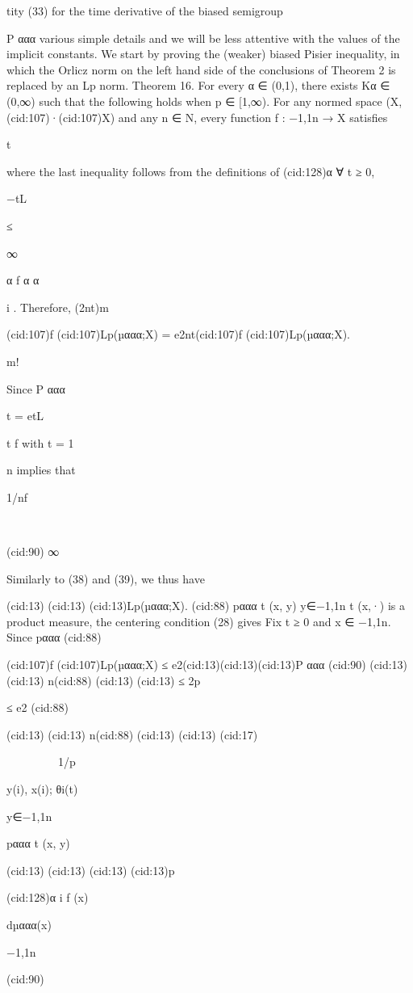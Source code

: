 tity (33) for the time derivative of the biased semigroup {P ααα
various simple details and we will be less attentive with the values of the implicit constants.
We start by proving the (weaker) biased Pisier inequality, in which the Orlicz norm on the
left hand side of the conclusions of Theorem 2 is replaced by an Lp norm.
Theorem 16. For every α ∈ (0,1), there exists Kα ∈ (0,∞) such that the following holds when
p ∈ [1,∞). For any normed space (X,(cid:107)·(cid:107)X) and any n ∈ N, every function f : {−1,1}n → X satisﬁes

t

where the last inequality follows from the deﬁnitions of (cid:128)α
∀ t ≥ 0,

−tL

≤

∞

α f
α
α

i . Therefore,
(2nt)m

(cid:107)f (cid:107)Lp(µααα;X) = e2nt(cid:107)f (cid:107)Lp(µααα;X).

m!

Since P ααα

t = etL

t f with t = 1

n implies that

1/nf










(cid:90) ∞

Similarly to (38) and (39), we thus have

(cid:13)
(cid:13)
(cid:13)Lp(µααα;X).
(cid:88)
pααα
t (x, y)
y∈{−1,1}n
t (x,·) is a product measure, the centering condition (28) gives
Fix t ≥ 0 and x ∈ {−1,1}n. Since pααα
(cid:88)

(cid:107)f (cid:107)Lp(µααα;X) ≤ e2(cid:13)(cid:13)(cid:13)P ααα
(cid:90)
(cid:13)
(cid:13) n(cid:88)
(cid:13)
(cid:13)
≤ 2p

≤ e2
(cid:88)

(cid:13)
(cid:13) n(cid:88)
(cid:13)
(cid:13)
(cid:17)








1/p

y(i), x(i); θi(t)

y∈{−1,1}n

pααα
t (x, y)

(cid:13)
(cid:13)
(cid:13)
(cid:13)p

(cid:128)α
i f (x)

dµααα(x)

{−1,1}n

(cid:90)

}

